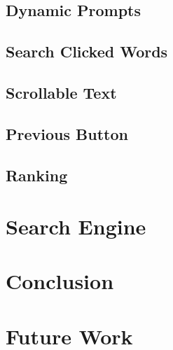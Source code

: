 \documentclass{sig-alternate-05-2015}
\begin{document}
\subsection{Dynamic Prompts}
\subsection{Search Clicked Words}
\subsection{Scrollable Text}
\subsection{Previous Button}
\subsection{Ranking}
\section{Search Engine}
\section{Conclusion}
\section{Future Work}
\end{document}
